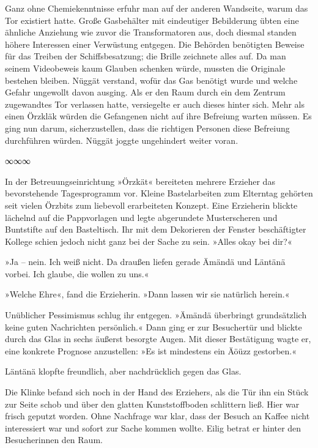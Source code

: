 Ganz ohne Chemiekenntnisse erfuhr man auf der anderen Wandseite, warum das Tor existiert hatte. Große Gasbehälter mit eindeutiger Bebilderung übten eine ähnliche Anziehung wie zuvor die Transformatoren aus, doch diesmal standen höhere Interessen einer Verwüstung entgegen. Die Behörden benötigten Beweise für das Treiben der Schiffsbesatzung; die Brille zeichnete alles auf. Da man seinem Videobeweis kaum Glauben schenken würde, mussten die Originale bestehen bleiben. Nüggät verstand, wofür das Gas benötigt wurde und welche Gefahr ungewollt davon ausging. Als er den Raum durch ein dem Zentrum zugewandtes Tor verlassen hatte, versiegelte er auch dieses hinter sich. Mehr als einen Örzkläk würden die Gefangenen nicht auf ihre Befreiung warten müssen. Es ging nun darum, sicherzustellen, dass die richtigen Personen diese Befreiung durchführen würden. Nüggät joggte ungehindert weiter voran.

\begin{center}
	∞∞∞
\end{center}

In der Betreuungseinrichtung »Örzkät« bereiteten mehrere Erzieher das bevorstehende Tagesprogramm vor. Kleine Bastelarbeiten zum Elterntag gehörten seit vielen Örzbits zum liebevoll erarbeiteten Konzept. Eine Erzieherin blickte lächelnd auf die Pappvorlagen und legte abgerundete Musterscheren und Buntstifte auf den Basteltisch. Ihr mit dem Dekorieren der Fenster beschäftigter Kollege schien jedoch nicht ganz bei der Sache zu sein. »Alles okay bei dir?«

»Ja – nein. Ich weiß nicht. Da draußen liefen gerade Ämändä und Läntänä vorbei. Ich glaube, die wollen zu uns.«

»Welche Ehre«, fand die Erzieherin. »Dann lassen wir sie natürlich herein.«

Unüblicher Pessimismus schlug ihr entgegen. »Ämändä überbringt grundsätzlich keine guten Nachrichten persönlich.« Dann ging er zur Besuchertür und blickte durch das Glas in sechs äußerst besorgte Augen. Mit dieser Bestätigung wagte er, eine konkrete Prognose anzustellen: »Es ist mindestens ein Äöüzz gestorben.«

Läntänä klopfte freundlich, aber nachdrücklich gegen das Glas. 

Die Klinke befand sich noch in der Hand des Erziehers, als die Tür ihn ein Stück zur Seite schob und über den glatten Kunststoffboden schlittern ließ. Hier war frisch geputzt worden. Ohne Nachfrage war klar, dass der Besuch an Kaffee nicht interessiert war und sofort zur Sache kommen wollte. Eilig betrat er hinter den Besucherinnen den Raum.

